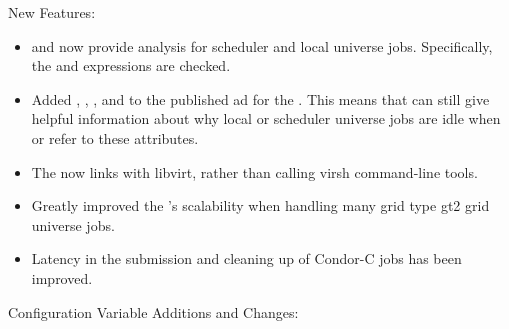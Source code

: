 \noindent New Features:

\begin{itemize}

\item {}  and  now provide
  analysis for scheduler and local universe jobs.  Specifically, the
   and
   expressions are checked.

\item Added , ,
, and 
to the published ad for the .  This means that
  can still give helpful information about
why local or scheduler universe jobs are idle when
 or
 refer to these attributes.

\item The  now links with libvirt, rather than calling
virsh command-line tools.

\item Greatly improved the 's scalability when handling
many grid type gt2 grid universe jobs.

\item Latency in the submission and cleaning up of Condor-C jobs
has been improved.

\end{itemize}

\noindent Configuration Variable Additions and Changes:

